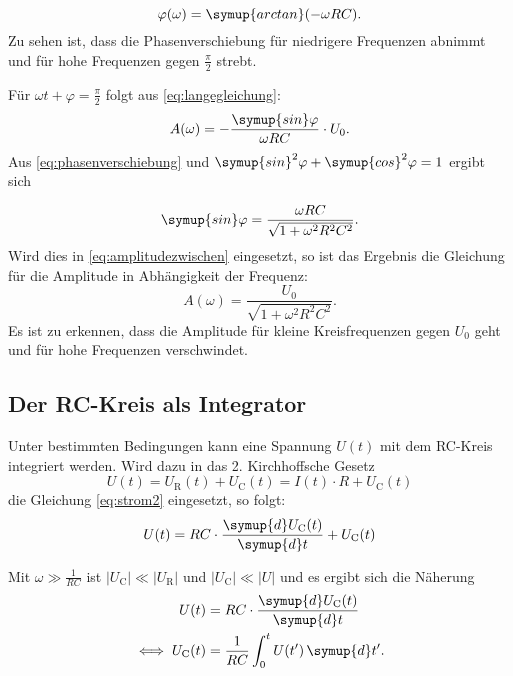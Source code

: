 \begin{equation}
\varphi(\omega) = \symup{arctan}(-\omega RC).
\label{eq:phasenverschiebung}
\end{equation}
Zu sehen ist, dass die Phasenverschiebung für niedrigere Frequenzen abnimmt und für hohe Frequenzen gegen $\frac{\pi}{2}$ strebt.

Für $\omega t + \varphi = \frac{\pi}{2}$ folgt aus \eqref{eq:langegleichung}:
\begin{equation}
A(\omega) = -\frac{\symup{sin}\varphi}{\omega RC}\cdot U_0.
\label{eq:amplitudezwischen}
\end{equation}
Aus \eqref{eq:phasenverschiebung} und $\symup{sin}^2 \varphi + \symup{cos}^2 \varphi = 1$ ergibt sich

\begin{equation*}
\symup{sin}\varphi = \frac{\omega RC}{\sqrt{1+\omega^2 R^2 C^2}}.
\end{equation*}
Wird dies in \eqref{eq:amplitudezwischen} eingesetzt, so ist das Ergebnis die Gleichung für die Amplitude in Abhängigkeit der Frequenz:
\begin{equation}
\label{eq:Meth2}
A(\omega) = \frac{U_0}{\sqrt{1+\omega^2 R^2 C^2}}.
\end{equation}
Es ist zu erkennen, dass die Amplitude für kleine Kreisfrequenzen gegen $U_0$ geht und für hohe Frequenzen verschwindet.


\subsection{Der RC-Kreis als Integrator}

Unter bestimmten Bedingungen kann eine Spannung $U(t)$ mit dem RC-Kreis integriert werden. Wird dazu in das 2. Kirchhoffsche Gesetz
\begin{equation*}
U(t) = U_{\text{R}}(t) + U_{\text{C}}(t) = I(t)\cdot R + U_{\text{C}}(t)
\end{equation*}
die Gleichung \eqref{eq:strom2} eingesetzt, so folgt:
\begin{equation*}
U(t) = RC\cdot \frac{\symup{d}U_{\text{C}}(t)}{\symup{d}t} + U_{\text{C}}(t) \\
\end{equation*}

Mit $\omega \gg \frac{1}{RC}$ ist $|U_{\text{C}}| \ll |U_{\text{R}}|$ und $|U_{\text{C}}| \ll |U|$ und es ergibt sich die Näherung
\begin{equation*}
\begin{aligned}
U(t) &= RC\cdot \frac{\symup{d}U_{\text{C}}(t)}{\symup{d}t} \\
\iff U_{\text{C}}(t) &= \frac{1}{RC} \int_0^t U(t')\, \symup{d}t'.
\end{aligned}
\end{equation*}
